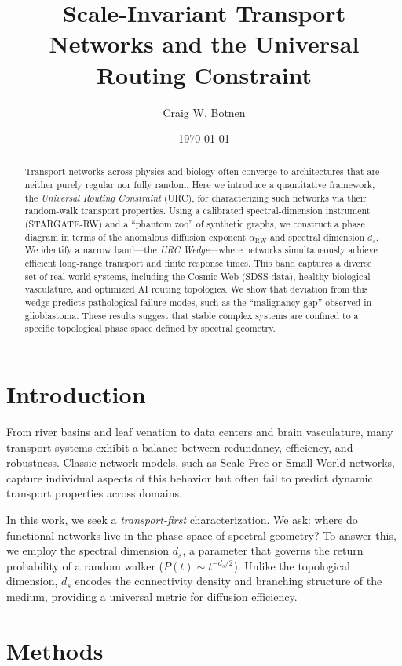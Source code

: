 \documentclass[11pt,a4paper]{article}
\title{Scale-Invariant Transport Networks and the Universal Routing Constraint}
\author{Craig W. Botnen}
\affil{Independent Researcher, Billings, Montana 59101, USA}
\affil{craigbotnen@gmail.com}
\date{\today}
\begin{document}
\maketitle

\begin{abstract}
Transport networks across physics and biology often converge to architectures that are neither purely regular nor fully random. Here we introduce a quantitative framework, the \emph{Universal Routing Constraint} (URC), for characterizing such networks via their random-walk transport properties. Using a calibrated spectral-dimension instrument (STARGATE-RW) and a ``phantom zoo'' of synthetic graphs, we construct a phase diagram in terms of the anomalous diffusion exponent $\alpha_{\mathrm{RW}}$ and spectral dimension $d_s$. We identify a narrow band---the \emph{URC Wedge}---where networks simultaneously achieve efficient long-range transport and finite response times. This band captures a diverse set of real-world systems, including the Cosmic Web (SDSS data), healthy biological vasculature, and optimized AI routing topologies. We show that deviation from this wedge predicts pathological failure modes, such as the ``malignancy gap'' observed in glioblastoma. These results suggest that stable complex systems are confined to a specific topological phase space defined by spectral geometry.
\end{abstract}

\section*{Introduction}

From river basins and leaf venation to data centers and brain vasculature, many transport systems exhibit a balance between redundancy, efficiency, and robustness. Classic network models, such as Scale-Free or Small-World networks, capture individual aspects of this behavior but often fail to predict dynamic transport properties across domains.

In this work, we seek a \emph{transport-first} characterization. We ask: where do functional networks live in the phase space of spectral geometry? To answer this, we employ the spectral dimension $d_s$, a parameter that governs the return probability of a random walker ($P(t) \sim t^{-d_s/2}$). Unlike the topological dimension, $d_s$ encodes the connectivity density and branching structure of the medium, providing a universal metric for diffusion efficiency.

\section*{Methods}
\end{document}

